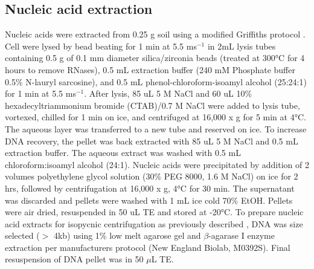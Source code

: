 \documentclass{article}
\begin{document}
\subsection{Nucleic acid extraction}
Nucleic acids were extracted from 0.25 g soil using a modified Griffiths
protocol \citep{Griffiths_2000}. Cell were lysed by bead beating for
1 min at 5.5 ms$^{-1}$ in 2mL lysis tubes containing 0.5 g of 0.1
mm diameter silica/zirconia beads (treated at 300°C for 4 hours to remove
RNases), 0.5 mL extraction buffer (240 mM Phosphate buffer 0.5\% N-lauryl
sarcosine), and 0.5 mL phenol-chloroform-isoamyl alcohol (25:24:1) for 1 min at
5.5 ms$^{-1}$. After lysis, 85 uL 5 M NaCl and 60 uL 10\%
hexadecyltriammonium bromide (CTAB)/0.7 M NaCl were added to lysis tube,
vortexed, chilled for 1 min on ice, and centrifuged at 16,000 x g for 5 min at
4°C. The aqueous layer was transferred to a new tube and reserved on ice. To
increase DNA recovery, the pellet was back extracted with 85 uL 5 M NaCl and
0.5 mL extraction buffer. The aqueous extract was washed with 0.5 mL
chloroform:isoamyl alcohol (24:1). Nucleic acids were precipitated by addition
of 2 volumes polyethylene glycol solution (30\% PEG 8000, 1.6 M NaCl) on ice
for 2 hrs, followed by centrifugation at 16,000 x g, 4°C for 30 min. The
supernatant was discarded and pellets were washed with 1 mL ice cold 70\% EtOH.
Pellets were air dried, resuspended in 50 uL TE and stored at -20°C. To prepare
nucleic acid extracts for isopycnic centrifugation as previously described
\citep{Buckley_2007}, DNA was size selected ($>$ 4kb) using 1\% low melt
agarose gel and $\beta$-agarase I enzyme extraction per manufacturers
protocol (New England Biolab, M0392S).  Final resuspension of DNA pellet
was in 50 $\mu$L TE.   
\end{document}
